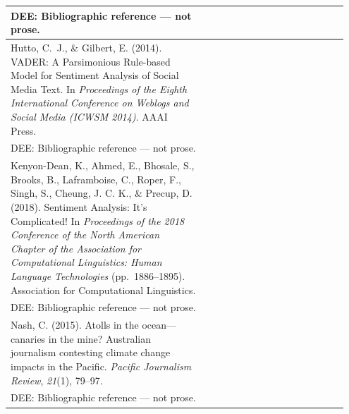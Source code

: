 \documentclass[11pt]{article}
\begin{document}
\begin{longtable}{|p{0.55\linewidth}|p{0.40\linewidth}|}
\hline
DEE: Bibliographic reference --- not prose. & \\
\hline
Hutto, C.~J., \& Gilbert, E. (2014). VADER: A Parsimonious Rule-based Model for Sentiment Analysis of Social Media Text. In \textit{Proceedings of the Eighth International Conference on Weblogs and Social Media (ICWSM 2014)}. AAAI Press. & \\[2pt]
\hline
DEE: Bibliographic reference --- not prose. & \\
\hline
Kenyon-Dean, K., Ahmed, E., Bhosale, S., Brooks, B., Laframboise, C., Roper, F., Singh, S., Cheung, J. C. K., \& Precup, D. (2018). Sentiment Analysis: It's Complicated! In \textit{Proceedings of the 2018 Conference of the North American Chapter of the Association for Computational Linguistics: Human Language Technologies} (pp.\ 1886--1895). Association for Computational Linguistics. & \\[2pt]
\hline
DEE: Bibliographic reference --- not prose. & \\
\hline
Nash, C. (2015). Atolls in the ocean---canaries in the mine? Australian journalism contesting climate change impacts in the Pacific. \textit{Pacific Journalism Review}, \textit{21}(1), 79--97. & \\[2pt]
\hline
DEE: Bibliographic reference --- not prose. & \\
\hline
\end{longtable}
\end{document}
